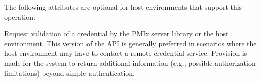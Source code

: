 \reqattrend

\optattrstart
The following attributes are optional for host environments that support this operation:


\optattrend

\descr

Request validation of a credential by the \ac{PMIx} server library or the host environment. This version of the \ac{API} is generally preferred in scenarios where the host environment may have to contact a remote credential service. Provision is made for the system to return additional information (e.g., possible authorization limitations) beyond simple authentication.

